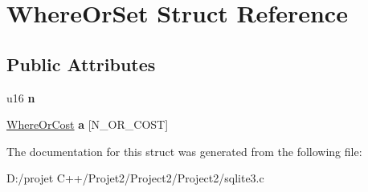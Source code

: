 \hypertarget{struct_where_or_set}{}\section{Where\+Or\+Set Struct Reference}
\label{struct_where_or_set}
\subsection*{Public Attributes}
\begin{DoxyCompactItemize}
\item 
\mbox{\label{struct_where_or_set_ac5fce5cb06eb3e01a77efe6643acd618}} 
u16 {\bfseries n}
\item 
\mbox{\label{struct_where_or_set_a2e78a14bf6f34f266a2ae2d046c7ba80}} 
\mbox{\hyperlink{struct_where_or_cost}{Where\+Or\+Cost}} {\bfseries a} \mbox{[}N\+\_\+\+O\+R\+\_\+\+C\+O\+ST\mbox{]}
\end{DoxyCompactItemize}


The documentation for this struct was generated from the following file\+:\begin{DoxyCompactItemize}
\item 
D\+:/projet C++/\+Projet2/\+Project2/\+Project2/sqlite3.\+c\end{DoxyCompactItemize}
